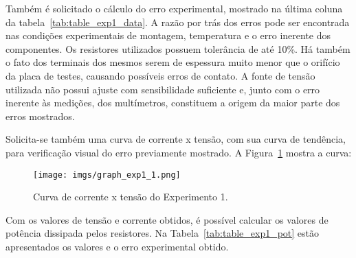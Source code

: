 \documentclass[a4paper,pra,aps,twocolumn,superscriptaddress,10pt,final]{revtex4-2}
\begin{document}
    Também é solicitado o cálculo do erro experimental, mostrado na última coluna da tabela~\ref{tab:table_exp1_data}. A razão por trás dos erros pode ser encontrada nas condições experimentais de montagem, temperatura e o erro inerente dos componentes. Os resistores utilizados possuem tolerância de até 10\%. Há também o fato dos terminais dos mesmos serem de espessura muito menor que o orifício da placa de testes, causando possíveis erros de contato. A fonte de tensão utilizada não possui ajuste com sensibilidade suficiente e, junto com o erro inerente às medições, dos multímetros, constituem a origem da maior parte dos erros mostrados.

    Solicita-se também uma curva de corrente x tensão, com sua curva de tendência, para verificação visual do erro previamente mostrado. A Figura~\ref{fig:curva_exp1} mostra a curva:

    \begin{figure}[H]
        \centering
        \caption{Curva de corrente x tensão do Experimento 1.}
        \texttt{[image: imgs/graph\_exp1\_1.png]}\\
        \label{fig:curva_exp1}
    \end{figure}

    Com os valores de tensão e corrente obtidos, é possível calcular os valores de potência dissipada pelos resistores. Na Tabela~\ref{tab:table_exp1_pot} estão apresentados os valores e o erro experimental obtido.         
\end{document}
